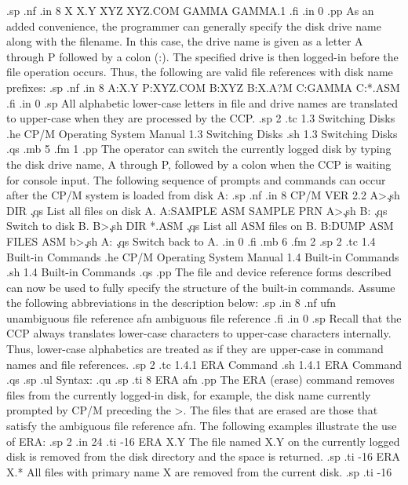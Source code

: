.sp
.nf
.in 8
X
X.Y
XYZ
XYZ.COM
GAMMA
GAMMA.1
.fi
.in 0
.pp
As an added convenience, the programmer can generally specify the disk drive
name along with the filename.  In this case, the drive name is given as a
letter A through P followed by a colon (:).  The specified drive is
then logged-in before the file operation occurs.  Thus, the following are
valid file references with disk name prefixes:
.sp
.nf
.in 8
A:X.Y
P:XYZ.COM
B:XYZ
B:X.A?M
C:GAMMA
C:*.ASM
.fi
.in 0
.sp
All alphabetic lower-case letters in file and drive names are translated to
upper-case when they are processed by the CCP.
.sp 2
.tc    1.3  Switching Disks
.he CP/M Operating System Manual                 1.3  Switching Disks
.sh
1.3  Switching Disks
.qs
.mb 5
.fm 1
.pp
The operator can switch the currently logged disk by typing the disk drive
name, A through P, followed by a colon when the CCP is waiting for
console input.  The following sequence of prompts and commands
can occur after the CP/M system is loaded from disk A:
.sp
.nf
.in 8
CP/M VER 2.2
A>\c
.sh
DIR                     \c
.qs
List all files on disk A.
A:SAMPLE ASM SAMPLE PRN
A>\c
.sh
B:                      \c
.qs
Switch to disk B.
B>\c
.sh
DIR *.ASM               \c
.qs
List all ASM files on B.
B:DUMP ASM FILES ASM
b>\c
.sh
A:                      \c
.qs
Switch back to A.
.in 0
.fi
.mb 6
.fm 2
.sp 2
.tc    1.4  Built-in Commands
.he CP/M Operating System Manual               1.4  Built-in Commands
.sh
1.4  Built-in Commands
.qs
.pp
The file and device reference forms described can now be used to fully
specify the structure of the built-in commands.  Assume the following
abbreviations in the description below:
.sp
.in 8
.nf
ufn   unambiguous file reference
afn   ambiguous file reference
.fi
.in 0
.sp
Recall that the CCP always translates lower-case characters to upper-case
characters internally.  Thus, lower-case alphabetics are treated as if they
are upper-case in command names and file references.
.sp 2
.tc         1.4.1  ERA Command
.sh
1.4.1  ERA Command
.qs
.sp
.ul
Syntax:
.qu
.sp
.ti 8
ERA afn
.pp
The ERA (erase) command removes files from the currently logged-in
disk, for example, the disk name currently prompted by CP/M preceding the >.
The files that are erased are those that satisfy the ambiguous file
reference afn.  The following examples illustrate the use of ERA:
.sp 2
.in 24
.ti -16
ERA X.Y         The file named X.Y on the currently logged disk is removed
from the disk directory and the space is returned.
.sp
.ti -16
ERA X.*         All files with primary name X are removed from the current
disk.
.sp
.ti -16
